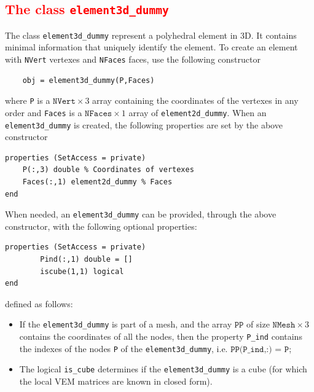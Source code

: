 \documentclass[a4paper]{article}
\newcommand{\red}[1]{\textcolor{red}{#1}}
\begin{document}
\subsection{\red{The class \texttt{element3d\_dummy}}}
The class \texttt{element3d\_dummy} represent a polyhedral element in 3D. It contains minimal information that uniquely identify the element. To create an element with \texttt{NVert} vertexes and \texttt{NFaces} faces, use the following constructor
\begin{lstlisting}
	obj = element3d_dummy(P,Faces)
\end{lstlisting}
where \texttt{P} is a $\texttt{NVert} \times 3$ array containing the coordinates of the vertexes in any order and \texttt{Faces} is a $\texttt{NFaces} \times 1$ array of \texttt{element2d\_dummy}.  When an \texttt{element3d\_dummy} is created, the following properties are set by the above constructor
\begin{lstlisting}
properties (SetAccess = private)
	P(:,3) double % Coordinates of vertexes
	Faces(:,1) element2d_dummy % Faces
end
\end{lstlisting}
When needed, an \texttt{element3d\_dummy} can be provided, through the above constructor, with the following optional properties:
\begin{lstlisting}
properties (SetAccess = private)
        Pind(:,1) double = []
        iscube(1,1) logical
end
\end{lstlisting}
defined as follows:
\begin{itemize}
\item If the \texttt{element3d\_dummy} is part of a mesh, and the array $\texttt{PP}$ of size $\texttt{NMesh} \times 3$ contains the coordinates of all the nodes, then the property \texttt{P\_ind} contains the indexes of the nodes \texttt{P} of the \texttt{element3d\_dummy}, i.e. $\texttt{PP(P\_ind,:) = P}$;
\item The logical \texttt{is\_cube} determines if the \texttt{element3d\_dummy} is a cube (for which the local VEM matrices are known in closed form).
\end{itemize}
\end{document}

